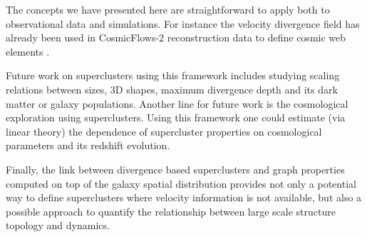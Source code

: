 \documentclass[usenatbib]{mnras}
\begin{document}
The concepts we have presented here are straightforward to apply both to observational data and simulations.
For instance the velocity divergence field has already been used in CosmicFlows-2 reconstruction data to define cosmic web elements \citep{2015MNRAS.452.1052L}. 

Future work on superclusters using this framework includes studying scaling relations between sizes, 3D shapes, maximum divergence depth and its dark matter or galaxy populations.
Another line for future work is the cosmological exploration using superclusters.
Using this framework one could estimate (via linear theory) the dependence of supercluster properties on cosmological parameters and its redshift evolution.

Finally, the link between divergence based superclusters and graph properties \citep{2020MNRAS.tmpL.153G} computed on top of the galaxy spatial distribution provides not only a potential way to define superclusters where velocity information is not available, but also a possible approach to quantify the relationship between large scale structure topology and dynamics.




\end{document}

